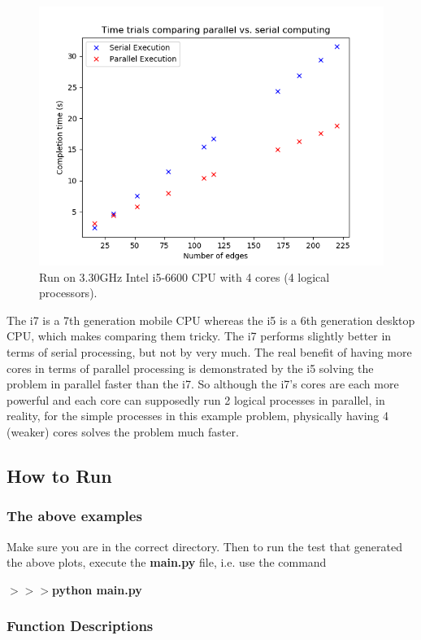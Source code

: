 \documentclass[12pt]{article}
\begin{document}
\begin{figure}[H]
	\includegraphics[scale=1]{Problem3-4cores.png}
	\caption{Run on 3.30GHz Intel i5-6600 CPU with 4 cores (4 logical processors).}
\end{figure}

The i7 is a 7th generation mobile CPU whereas the i5 is a 6th generation desktop CPU, which makes comparing them tricky. The i7 performs slightly better in terms of serial processing, but not by very much. The real benefit of having more cores in terms of parallel processing is demonstrated by the i5 solving the problem in parallel faster than the i7. So although the i7's cores are each more powerful and each core can supposedly run 2 logical processes in parallel, in reality, for the simple processes in this example problem, physically having 4 (weaker) cores solves the problem much faster.


\subsection*{How to Run}

\subsubsection*{The above examples}

Make sure you are in the correct directory. Then to run the test that generated the above plots, execute the \textbf{main.py} file, i.e. use the command

\noindent \textbf{$>>>$python main.py}

\subsubsection*{Function Descriptions}
\end{document}
